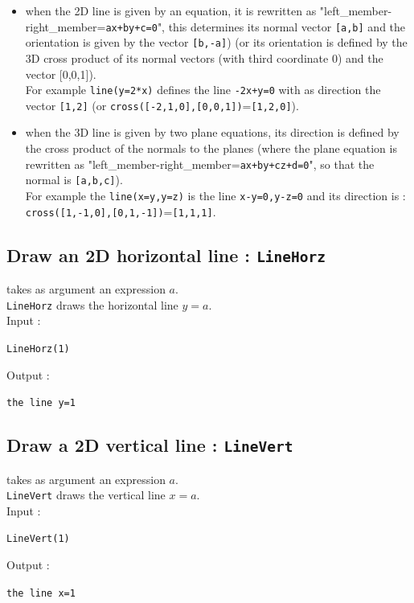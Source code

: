 \documentclass[a4paper,11pt]{book}
\begin{document}
\begin{itemize}
\item when the 2D line is given by an equation, it is rewritten
as "left\_member-right\_member={\tt ax+by+c=0}", this determines
its normal vector {\tt [a,b]} and the orientation is given by the vector 
{\tt [b,-a]}) (or its orientation is defined by the 3D cross product of its
normal vectors (with third coordinate 0) and the vector [0,0,1]).\\
For example {\tt line(y=2*x)} defines the line {\tt -2x+y=0} with as direction 
the vector {\tt [1,2]} (or {\tt cross([-2,1,0],[0,0,1])}={\tt [1,2,0]}).
\item when the 3D line is given by two plane equations, its 
direction is defined by the cross product of the normals to the planes 
(where the plane equation is rewritten as
"left\_member-right\_member={\tt ax+by+cz+d=0}", so that
the normal is {\tt [a,b,c]}).\\
For example the {\tt line(x=y,y=z)} is the line {\tt x-y=0,y-z=0} and its
direction is :\\
{\tt cross([1,-1,0],[0,1,-1])}={\tt [1,1,1]}.
\end{itemize}

\subsection{Draw an 2D horizontal line : {\tt LineHorz}}
 takes as argument an expression $a$.\\
 {\tt LineHorz} draws the horizontal line $y=a$.\\
Input :
\begin{center}{\tt LineHorz(1)}\end{center}
Output :
\begin{center}{\tt the line y=1}\end{center}

\subsection{Draw a 2D vertical line : {\tt LineVert}}
 takes as argument an expression $a$.\\
 {\tt LineVert} draws the vertical line $x=a$.\\
Input :
\begin{center}{\tt LineVert(1)}\end{center}
Output :
\begin{center}{\tt the line x=1}\end{center}
\end{document}
